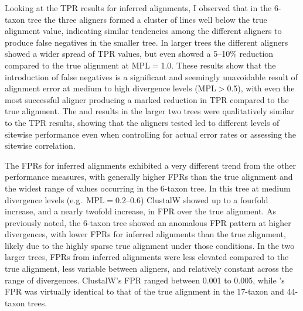 Looking at the TPR results for inferred alignments, I observed that
in the 6-taxon tree the three aligners formed a cluster of lines well
below the true alignment value, indicating similar tendencies among
the different aligners to produce false negatives in the smaller
tree. In larger trees the different aligners showed a wider spread of
TPR values, but even \prankc{} showed a 5--10\% reduction compared to
the true alignment at MPL$=$1.0. These results show that the
introduction of false negatives is a significant and seemingly
unavoidable result of alignment error at medium to high divergence
levels (MPL$>$0.5), with even the most successful aligner producing
a marked reduction in TPR compared to the true alignment. The \tpr and
\omg results in the larger two trees were qualitatively similar to
the TPR results, showing that the aligners tested led to different
levels of sitewise performance even when controlling for actual error
rates or assessing the sitewise \omg correlation.

The FPRs for inferred alignments exhibited a very different trend from
the other performance measures, with generally higher FPRs than the
true alignment and the widest range of values occurring in the 6-taxon
tree. In this tree at medium divergence levels (e.g.\, MPL$=$0.2--0.6)
ClustalW showed up to a fourfold increase, and \prankc{} a nearly
twofold increase, in FPR over the true alignment. As previously noted,
the 6-taxon tree showed an anomalous FPR pattern at higher
divergences, with lower FPRs for inferred alignments than the true
alignment, likely due to the highly sparse true alignment under those
conditions. In the two larger trees, FPRs from inferred alignments
were less elevated compared to the true alignment, less variable
between aligners, and relatively constant across the range of
divergences. ClustalW's FPR ranged between 0.001 to 0.005, while
\prankc{}'s FPR was virtually identical to that of the true alignment
in the 17-taxon and 44-taxon trees.

